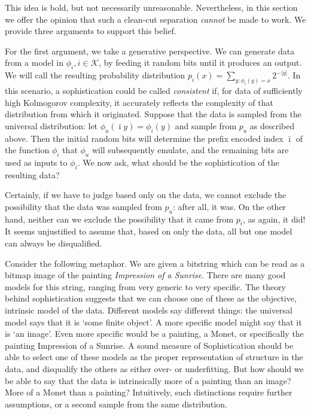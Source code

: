 \documentclass{style/llncs}
\newcommand{\K}{\mathscr K}
\begin{document}
This idea is bold, but not necessarily unreasonable. Nevertheless, in this section we offer the opinion that such a clean-cut separation \emph{cannot} be made to work. We provide three arguments to support this belief.

For the first argument, we take a generative perspective. We can generate data from a model in $\phi_i, i \in \K$, by feeding it random bits until it produces an output. We will call the resulting probability distribution $p_i(x) = \sum_{y:\phi_i(y) = x} 2^{-|y|}$. In this scenario, a sophistication could be called \emph{consistent} if, for data of sufficiently high Kolmogorov complexity, it accurately reflects the complexity of that distribution from which it originated. Suppose that the data is sampled from the universal distribution: let $\phi_u(\bar\imath y)=\phi_i(y)$ and sample from $p_u$ as described above. Then the initial random bits will determine the prefix encoded index $\bar\imath$ of the function $\phi_i$ that $\phi_u$ will subsequently emulate, and the remaining bits are used as inputs to $\phi_i$. We now ask, what should be the sophistication of the resulting data? 

Certainly, if we have to judge based only on the data, we cannot exclude the possibility that the data was sampled from $p_u$: after all, it was.  On the other hand, neither can we exclude the possibility that it came from $p_i$, as again, it did! It seems unjustified to assume that, based on only the data, all but one model can always be disqualified.

Consider the following metaphor. We are given a bitstring which can be read as a bitmap image of the painting \emph{Impression of a Sunrise}. There are many good models for this string, ranging from very generic to very specific. The theory behind sophistication suggests that we can choose one of these as the objective, intrinsic model of the data. Different models say different things: the universal model says that it is `some finite object'. A more specific model might say that it is `an image'. Even more specific would be a painting, a Monet, or specifically the painting Impression of a Sunrise. A sound measure of Sophistication should be able to select one of these models as the proper representation of structure in the data, and disqualify the others as either over- or underfitting. But how should we be able to say that the data is intrinsically more of a painting than an image? More of a Monet than a painting? Intuitively, such distinctions require further assumptions, or a second sample from the same distribution.
\end{document}
